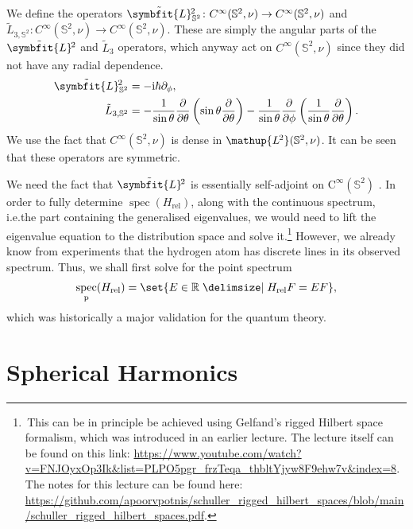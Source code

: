 \documentclass[12pt, a4 paper]{article}
\theoremstyle{definition}
\newcommand{\ltwo}{\mathup{L\kern-0.7pt^2}}
\newcommand{\rr}{\mathbb{R}}
\renewcommand{\i}{\mathrm{i}}
\DeclareMathOperator{\spec}{spec}
\newcommand{\lvecsquare}{\tilde{\symbfit{L}}\kern-1pt^2}
\begin{document}
	We define the operators $\lvecsquare_{\,\mathbb{S}^2} \colon C^\infty(\mathbb{S}^2, \nu) \rightarrow C^\infty(\mathbb{S}^2, \nu)$ and $\tilde{L}_{3, \mathbb{S}^2} \colon C^\infty(\mathbb{S}^2, \nu) \rightarrow C^\infty(\mathbb{S}^2, \nu)$. These are simply the angular parts of the $\lvecsquare$ and $\tilde{L}_3$ operators, which anyway act on $C^\infty(\mathbb{S}^2, \nu)$ since they did not have any radial dependence.
	\begin{align*}
	    \lvecsquare_{\,\mathbb{S}^2} &= -\i\hbar\partial_\phi,\\
		\tilde{L}_{3, \mathbb{S}^2}  &= -\frac{1}{\sin{\theta}}\frac{\partial}{\partial \theta}\left(\sin{\theta}\frac{\partial}{\partial\theta}\right) -\frac{1}{\sin{\theta}}\frac{\partial}{\partial\phi}\left(\frac{1}{\sin{\theta}}\frac{\partial}{\partial\theta}\right).
	\end{align*}
	We use the fact that $C^\infty(\mathbb{S}^2, \nu)$ is dense in $\ltwo(\mathbb{S}^2, \nu)$. It can be seen that these operators are symmetric.





	We need the fact that $\lvecsquare$ is essentially self-adjoint on $\mathrm{C}^\infty(\mathbb{S}^2)$ \cite{MorettiDomain}. In order to fully determine $\spec(H_\text{rel})$, along with the continuous spectrum, i.e.\@ the part containing the generalised eigenvalues, we would need to lift the eigenvalue equation to the distribution space and solve it.\footnote{\,This can be in principle be achieved using Gelfand's rigged Hilbert space formalism, which was introduced in an earlier lecture. The lecture itself can be found on this link: \url{https://www.youtube.com/watch?v=FNJOyxOp3Ik&list=PLPO5pgr_frzTeqa_thbltYjyw8F9ehw7v&index=8}. The notes for this lecture can be found here: \url{https://github.com/apoorvpotnis/schuller_rigged_hilbert_spaces/blob/main/schuller_rigged_hilbert_spaces.pdf}.} However, we already know from experiments that the hydrogen atom has discrete lines in its observed spectrum. Thus, we shall first solve for the point spectrum
	\begin{align*}
		\spec_{\text{p}}(H_\text{rel}) = \set{E \in \rr \given H_\text{rel} F = E F},
	\end{align*}
	which was historically a major validation for the quantum theory.

	\section{Spherical Harmonics}
\end{document}
